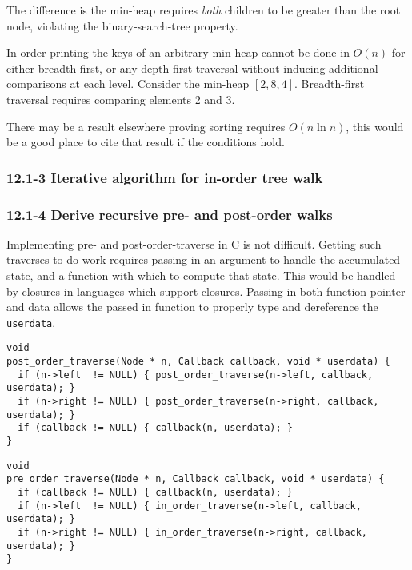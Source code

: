 \documentclass{article}
\begin{document}
The difference is the min-heap requires \emph{both} children to be
greater than the root node, violating the binary-search-tree property.

In-order printing the keys of an arbitrary min-heap cannot be done in $O(n)$
for either breadth-first, or any depth-first traversal without inducing
additional comparisons at each level. Consider the min-heap $[2, 8, 4]$.
Breadth-first traversal requires comparing elements 2 and 3.

There may be a result elsewhere proving sorting requires $O(n\ln n)$,
this would be a good place to cite that result if the conditions hold.

\subsubsection{12.1-3 Iterative algorithm for in-order tree walk}

\subsubsection{12.1-4 Derive recursive pre- and post-order walks}

Implementing pre- and post-order-traverse in C is not difficult. Getting
such traverses to do work requires passing in an argument to handle
the accumulated state, and a function with which to compute that state.
This would be handled by closures in languages which support closures.
Passing in both function pointer and data allows the passed in function
to properly type and dereference the \texttt{userdata}.

\begin{lstlisting}[frame=single,title=Post-order traverse]
void
post_order_traverse(Node * n, Callback callback, void * userdata) {
  if (n->left  != NULL) { post_order_traverse(n->left, callback, userdata); }
  if (n->right != NULL) { post_order_traverse(n->right, callback, userdata); }
  if (callback != NULL) { callback(n, userdata); }
}
\end{lstlisting}

\begin{lstlisting}[frame=single,title=Pre-order traverse]
void
pre_order_traverse(Node * n, Callback callback, void * userdata) {
  if (callback != NULL) { callback(n, userdata); }
  if (n->left  != NULL) { in_order_traverse(n->left, callback, userdata); }
  if (n->right != NULL) { in_order_traverse(n->right, callback, userdata); }
}
\end{lstlisting}
\end{document}
